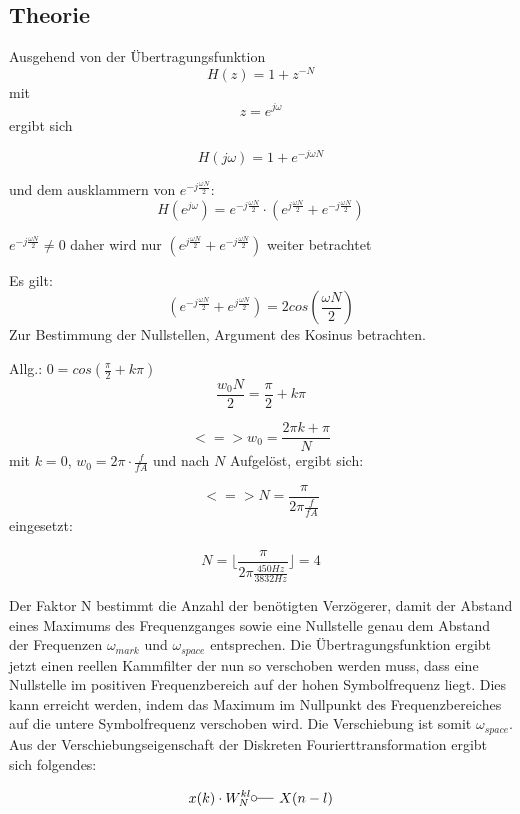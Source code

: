 \documentclass{article}
\begin{document}
\subsection{Theorie}


Ausgehend von der Übertragungsfunktion 
$$H(z) = 1 + z^{-N}$$ 
mit 
$$ z = e^{j\omega} $$
ergibt sich

$$H(j\omega) = 1 + e^{-j\omega N}$$

und dem ausklammern von $ e^{-j \frac{\omega N}{2}}$:
$$
H(e^{j\omega}) = e^{-j \frac{\omega N}{2}} \cdot (e^{j \frac{\omega N}{2}} + e^{-j \frac{\omega N}{2}})
$$

$e^{-j \frac{\omega N}{2}} \neq 0$ daher wird nur $(e^{j \frac{\omega N}{2}} + e^{-j \frac{\omega N}{2}})$ weiter betrachtet

Es gilt:
$$
(e^{-j \frac{\omega N}{2}} + e^{j \frac{\omega N}{2}}) = 2  cos(\frac{\omega N}{2})
$$
Zur Bestimmung der Nullstellen, Argument des Kosinus betrachten.

Allg.: $0 = cos(\frac{\pi}{2} + k\pi)$
$$
\frac{w_0 N}{2} = \frac{\pi}{2} + k\pi
$$

$$
<=> w_0 = \frac{2\pi k + \pi}{N}
$$
mit $k = 0$, $w_0 = 2\pi \cdot \frac{f}{fA}$ und nach $N$ Aufgelöst, ergibt sich:

$$
<=> N = \frac{\pi}{2\pi \frac{f}{fA}}
$$
eingesetzt:

$$
N = \lfloor \frac{\pi}{2\pi \frac{450Hz}{3832Hz}}\rfloor = 4
$$

Der Faktor N bestimmt die Anzahl der benötigten Verzögerer, damit der Abstand eines Maximums des Frequenzganges sowie eine Nullstelle genau dem Abstand der Frequenzen $\omega_{mark}$ und $\omega_{space}$ entsprechen. Die Übertragungsfunktion ergibt jetzt einen reellen Kammfilter der nun so verschoben werden muss, dass eine Nullstelle im positiven Frequenzbereich auf der hohen Symbolfrequenz liegt. Dies kann erreicht werden, indem das Maximum im Nullpunkt des Frequenzbereiches auf die untere Symbolfrequenz verschoben wird. Die Verschiebung ist somit $\omega_{space}$.
Aus der Verschiebungseigenschaft der Diskreten Fourierttransformation ergibt sich folgendes:
 
$$
x(k) \cdot W^{kl}_N \fourier X(n-l)
$$
\end{document}
